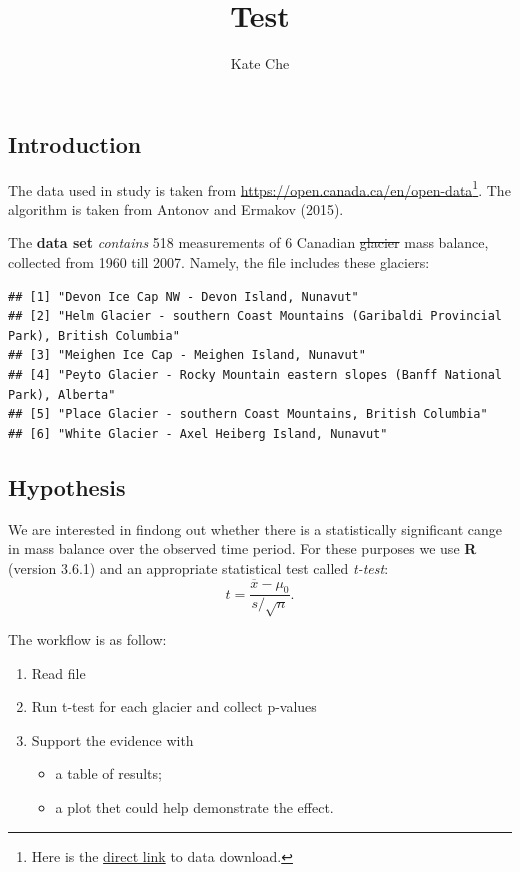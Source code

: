 \documentclass[]{article}
\title{Test}
\author{Kate Che}
\date{}
\providecommand{\tightlist}{%
  \setlength{\itemsep}{0pt}\setlength{\parskip}{0pt}}
\let\rmarkdownfootnote\footnote%
\def\footnote{\protect\rmarkdownfootnote}
\begin{document}
\maketitle

{
\hypersetup{linkcolor=black}
\setcounter{tocdepth}{2}
\tableofcontents
}
\hypertarget{introduction}{%
\subsection{Introduction}\label{introduction}}

The data used in study is taken from
\url{https://open.canada.ca/en/open-data}\footnote{Here is the
  \href{https://open.canada.ca/data/en/dataset/57ba3e50-2024-4570-8acf-4b99544fb689}{direct
  link} to data download.}. The algorithm is taken from Antonov and
Ermakov (2015).

The \textbf{data set} \emph{contains} 518 measurements of 6 Canadian
\sout{glacier} mass balance, collected from 1960 till 2007. Namely, the
file includes these glaciers:

\begin{verbatim}
## [1] "Devon Ice Cap NW - Devon Island, Nunavut"                                             
## [2] "Helm Glacier - southern Coast Mountains (Garibaldi Provincial Park), British Columbia"
## [3] "Meighen Ice Cap - Meighen Island, Nunavut"                                            
## [4] "Peyto Glacier - Rocky Mountain eastern slopes (Banff National Park), Alberta"         
## [5] "Place Glacier - southern Coast Mountains, British Columbia"                           
## [6] "White Glacier - Axel Heiberg Island, Nunavut"
\end{verbatim}

\hypertarget{hypothesis}{%
\subsection{Hypothesis}\label{hypothesis}}

We are interested in findong out whether there is a statistically
significant cange in mass balance over the observed time period. For
these purposes we use \textbf{R} (version 3.6.1) and an appropriate
statistical test called \emph{t-test}:
\[t = \frac{\overline{x} - \mu_0}{s/\sqrt{n}}. \]

The workflow is as follow:

\begin{enumerate}
\def\labelenumi{\arabic{enumi}.}
\tightlist
\item
  Read file
\item
  Run t-test for each glacier and collect p-values
\item
  Support the evidence with

  \begin{itemize}
  \tightlist
  \item
    a table of results;
  \item
    a plot thet could help demonstrate the effect.
  \end{itemize}
\end{enumerate}
\end{document}
